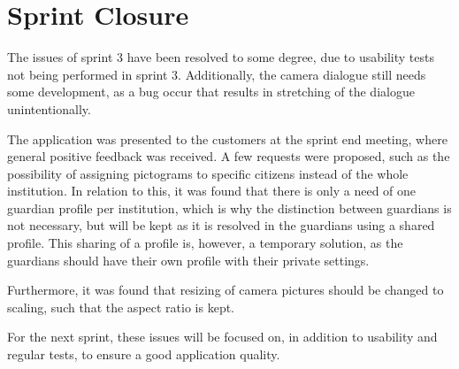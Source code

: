 \section{Sprint Closure}
The issues of sprint 3 have been resolved to some degree, due to usability tests not being performed in sprint 3.
Additionally, the camera dialogue still needs some development, as a bug occur that results in stretching of the dialogue unintentionally.

The application was presented to the customers at the sprint end meeting, where general positive feedback was received.
A few requests were proposed, such as the possibility of assigning pictograms to specific citizens instead of the whole institution.
In relation to this, it was found that there is only a need of one guardian profile per institution, which is why the distinction between guardians is not necessary, but will be kept as it is resolved in the guardians using a shared profile.
This sharing of a profile is, however, a temporary solution, as the guardians should have their own profile with their private settings.

Furthermore, it was found that resizing of camera pictures should be changed to scaling, such that the aspect ratio is kept.

For the next sprint, these issues will be focused on, in addition to usability and regular tests, to ensure a good application quality.